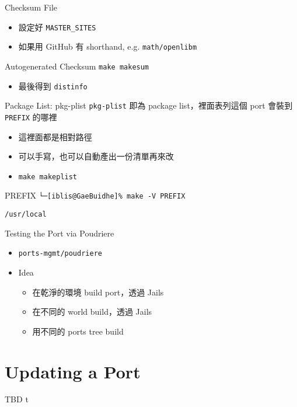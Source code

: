 \documentclass[aspectratio=169]{beamer}
\begin{document}
\begin{frame}[t,fragile]{Checksum File}
  \begin{itemize}
    \item 設定好 \verb`MASTER_SITES`
    \item 如果用 GitHub 有 shorthand, e.g. \verb`math/openlibm`
  \end{itemize}
  \begin{block}{Autogenerated Checksum}
    \verb`make makesum`
  \end{block}
  \begin{itemize}
    \item 最後得到 \verb`distinfo`
  \end{itemize}
\end{frame}

\begin{frame}[t,fragile]{Package List: pkg-plist}
  \verb`pkg-plist` 即為 package list，裡面表列這個 port 會裝到 \verb`PREFIX` 的哪裡
  \begin{itemize}
      \item 這裡面都是相對路徑
      \item 可以手寫，也可以自動產出一份清單再來改
      \item \verb`make makeplist`
  \end{itemize}

  \begin{block}{PREFIX}
    \verb`└─[iblis@GaeBuidhe]% make -V PREFIX`

    \verb`/usr/local`
  \end{block}

\end{frame}

\begin{frame}[t,fragile]{Testing the Port via Poudriere}
  \begin{itemize}
    \item \verb`ports-mgmt/poudriere`
    \item Idea
      \begin{itemize}
        \item 在乾淨的環境 build port，透過 Jails
        \item 在不同的 world build，透過 Jails
        \item 用不同的 ports tree build
      \end{itemize}
  \end{itemize}
\end{frame}

\section{Updating a Port}
\begin{frame}[t]{TBD}
  t
\end{frame}
\end{document}
